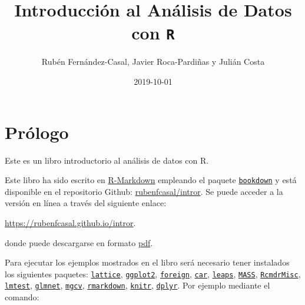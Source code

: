 \documentclass[]{book}
\title{Introducción al Análisis de Datos con \texttt{R}}
\author{Rubén Fernández-Casal, Javier Roca-Pardiñas y Julián Costa}
\date{2019-10-01}
\begin{document}
\maketitle

{
\setcounter{tocdepth}{1}
\tableofcontents
}
\chapter*{Prólogo}\label{prologo}

Este es un libro introductorio al análisis de datos con R.

Este libro ha sido escrito en
\href{http://rmarkdown.rstudio.com}{R-Markdown} empleando el paquete
\href{https://bookdown.org/yihui/bookdown/}{\texttt{bookdown}} y está
disponible en el repositorio Github:
\href{https://github.com/rubenfcasal/book_remuestreo}{rubenfcasal/intror}.
Se puede acceder a la versión en línea a través del siguiente enlace:

\url{https://rubenfcasal.github.io/intror}.

donde puede descargarse en formato
\href{https://rubenfcasal.github.io/intror/Intro_Analisis_Datos_R.pdf}{pdf}.

Para ejecutar los ejemplos mostrados en el libro será necesario tener
instalados los siguientes paquetes:
\href{https://cran.r-project.org/web/packages/lattice/index.html}{\texttt{lattice}},
\href{https://cran.r-project.org/web/packages/ggplot2/index.html}{\texttt{ggplot2}},
\href{https://cran.r-project.org/web/packages/foreign/index.html}{\texttt{foreign}},
\href{https://cran.r-project.org/web/packages/car/index.html}{\texttt{car}},
\href{https://cran.r-project.org/web/packages/leaps/index.html}{\texttt{leaps}},
\href{https://cran.r-project.org/web/packages/MASS/index.html}{\texttt{MASS}},
\href{https://cran.r-project.org/web/packages/RcmdrMisc/index.html}{\texttt{RcmdrMisc}},
\href{https://cran.r-project.org/web/packages/lmtest/index.html}{\texttt{lmtest}},
\href{https://cran.r-project.org/web/packages/glmnet/index.html}{\texttt{glmnet}},
\href{https://cran.r-project.org/web/packages/mgcv/index.html}{\texttt{mgcv}},
\href{https://cran.r-project.org/web/packages/rmarkdown/index.html}{\texttt{rmarkdown}},
\href{https://cran.r-project.org/web/packages/knitr/index.html}{\texttt{knitr}},
\href{https://cran.r-project.org/web/packages/dplyr/index.html}{\texttt{dplyr}}.
Por ejemplo mediante el comando:
\end{document}
